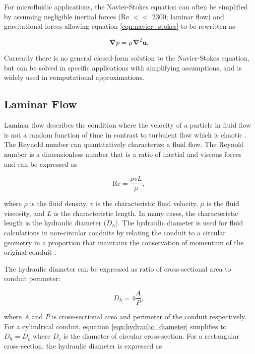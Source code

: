 \noindent For microfluidic applications, the Navier-Stokes equation can often be simplified by assuming negligible inertial forces (Re $<<$ 2300; laminar flow) and gravitational forces allowing equation \ref{eqn:navier_stokes} to be rewritten as

\begin{equation}
        \boldsymbol{\nabla}p = \mu\boldsymbol{\nabla}^2\textbf{u}.
\end{equation}

\par Currently there is no general closed-form solution to the Navier-Stokes equation, but can be solved in specific applications with simplifying assumptions, and is widely used in computational approximations.

\subsection*{Laminar Flow}
\par Laminar flow describes the condition where the velocity of a particle in fluid flow is not a random function of time in contrast to turbulent flow which is chaotic \cite{pamb}. The Reynold number can quantitatively characterize a fluid flow. The Reynold number is a dimensionless number that is a ratio of inertial and viscous forces and can be expressed as

\begin{equation}
    \text{Re} = \frac{\rho v L}{\mu},
\end{equation}

\noindent where $\rho$ is the fluid density, $v$ is the characteristic fluid velocity, $\mu$ is the fluid viscosity, and $L$ is the characteristic length. In many cases, the characteristic length is the hydraulic diameter ($D_h$). The hydraulic diameter is used for fluid calculations in non-circular conduits by relating the conduit to a circular geometry in a proportion that maintains the conservation of momentum of the original conduit \cite{PAMB}.

\par The hydraulic diameter can be expressed as ratio of cross-sectional area to conduit perimeter:

\begin{equation}
    D_h = 4 \frac{A}{P},
    \label{eqn:hydraulic_diameter}
\end{equation}

\noindent where $A$ and $P$ is cross-sectional area and perimeter of the conduit respectively. For a cylindrical conduit, equation \ref{eqn:hydraulic_diameter} simplifies to $D_h = D_c$ where $D_c$ is the diameter of circular cross-section. For a rectangular cross-section, the hydraulic diameter is expressed as 

